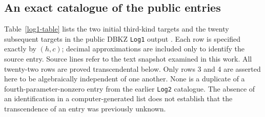 \documentclass[11pt,a4paper]{article}
\theoremstyle{definition}
\theoremstyle{remark}
\numberwithin{equation}{section}
\begin{document}
\subsection{An exact catalogue of the public entries}

Table~\ref{log1-table} lists the two initial third-kind targets and the
twenty subsequent targets in the public DBKZ \texttt{Log1} output
\cite{log1-dbkz}. Each row is specified exactly by $(h,c)$; decimal
approximations are included only to identify the source entry. Source
lines refer to the text snapshot examined in this work. All twenty-two
rows are proved transcendental below. Only rows 3 and 4 are asserted here
to be algebraically independent of one another. None is a duplicate of a
fourth-parameter-nonzero entry from the earlier \texttt{Log2} catalogue.
The absence of an identification in a computer-generated list does not
establish that the transcendence of an entry was previously unknown.
\end{document}
